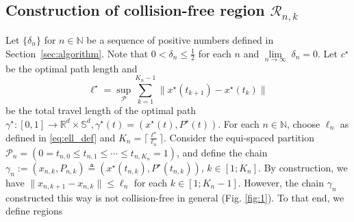 \documentclass[Afour,sageh,times]{sagej}
\begin{document}
\subsection{Construction of collision-free region \texorpdfstring{$\mathcal{R}_{n,k}$}{R}\label{sec:construction_free_rnk}}
\label{sec:event_d_n}
Let $\{\delta_n\}$ for $n\in\mathbb{N}$ be a sequence of positive numbers defined in Section~\ref{sec:algorithm}. Note that $0< \delta_n \leq \frac{1}{2}$ for each $n$ and $\underset{n\rightarrow\infty}{\lim}\;\delta_n=0$. Let $c^\star$ be the optimal path length and
\[
\ell^\star=\sup_{\mathcal{P}} \sum_{k=1}^{K_n-1}\|x^\star(t_{k+1})-x^\star(t_k)\|
\]
be the total travel length of the optimal path $\gamma^\star:[0,1]\rightarrow \mathbb{R}^d \times \mathbb{S}^d, \gamma^\star(t)=(x^\star(t), P^\star(t))$. 
For each $n\in \mathbb{N}$, choose $\ell_n$ as defined in \eqref{eq:ell_def}
and $K_n=\lceil \frac{\ell^\star}{\ell_n} \rceil$. Consider the equi-spaced partition $\mathcal{P}_n=(0=t_{n,0}\leq t_{n,1} \leq \cdots \leq t_{n,K_n}=1)$, and define the chain $\gamma_n:=(x_{n,k}, P_{n,k})\triangleq (x^\star(t_{n,k}), P^\star(t_{n,k}))$, $k\in[1;K_n]$.
By construction, we have $\|x_{n,k+1}-x_{n,k}\|\leq \ell_n$ for each $k\in[1;K_n-1]$. However,
the chain $\gamma_n$ constructed this way is not collision-free in general (Fig. \ref{fig:1}). To that end, we define regions 
\end{document}
